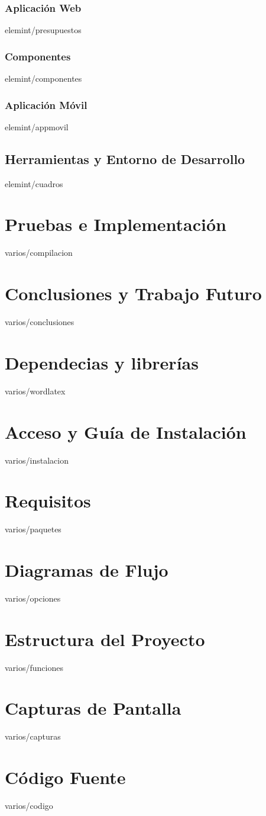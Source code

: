 \documentclass[epsbased,copyright,final,printable,covers,extendedindex,firstnumbered,tfg,gnuplot]{tfgtfmthesisuam}
\begin{document}
    \subsection{Aplicación Web\label{SS:PRESUPUESTOS}}{elemint/presupuestos}
    \subsection{Componentes\label{SS:COMPONENTES}}{elemint/componentes}
    \subsection{Aplicación Móvil\label{SS:APPMOVIL}}{elemint/appmovil}
  \section{Herramientas y Entorno de Desarrollo\label{SEC:CUADROS}}{elemint/cuadros}

\chapter{Pruebas e Implementación\label{CAP:COMPILACION}}{varios/compilacion}

\chapter{Conclusiones y Trabajo Futuro\label{CAP:CONCLUSIONES}}{varios/conclusiones}

\appendix

\chapter{Dependecias y librerías\label{CAP:WORDLATEX}}{varios/wordlatex}
\chapter{Acceso y Guía de Instalación\label{CAP:INSTALACION}}{varios/instalacion}
\chapter{Requisitos\label{CAP:PAQUETES}}{varios/paquetes}
\chapter{Diagramas de Flujo\label{CAP:OPCIONES}}{varios/opciones}
\chapter{Estructura del Proyecto\label{CAP:FUNCENT}}{varios/funciones}
\chapter{Capturas de Pantalla\label{CAP:CAPTURAS}}{varios/capturas}
\chapter{Código Fuente\label{CAP:CODIGO}}{varios/codigo}
\end{document}
